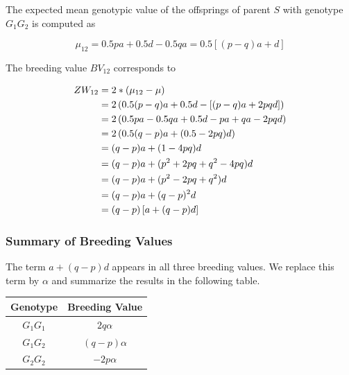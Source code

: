 \documentclass[
]{book}
\theoremstyle{definition}
\theoremstyle{definition}
\theoremstyle{definition}
\theoremstyle{remark}
\begin{document}
\vspace{5ex}

The expected mean genotypic value of the offsprings of parent \(S\) with genotype \(G_1G_2\) is computed as

\begin{equation}
\mu_{12} = 0.5pa + 0.5d - 0.5qa = 0.5\left[(p-q)a + d \right]
\label{eq:MeanOffGen12}
\end{equation}

The breeding value \(BV_{12}\) corresponds to

\begin{align}
ZW_{12} &=   2*(\mu_{12} - \mu) \notag \\
        &=   2\left(0.5(p-q)a + 0.5d - \left[(p - q)a + 2pqd \right] \right) \notag \\
        &=   2\left(0.5pa - 0.5qa + 0.5d - pa + qa - 2pqd \right) \notag \\
        &=   2\left(0.5(q-p)a + (0.5 - 2pq)d \right) \notag \\
        &=   (q-p)a + (1-4pq)d  \notag \\
        &=   (q-p)a + (p^2 + 2pq + q^2 -4pq)d  \notag \\
        &=   (q-p)a + (p^2 - 2pq + q^2)d  \notag \\
        &=   (q-p)a + (q - p)^2d   \notag \\
        &=   (q-p)\left[a + (q-p)d \right]
\label{eq:BVGen12}
\end{align}

\hypertarget{summary-of-breeding-values}{%
\subsubsection{Summary of Breeding Values}\label{summary-of-breeding-values}}

The term \(a + (q-p)d\) appears in all three breeding values. We replace this term by \(\alpha\) and summarize the results in the following table.

\vspace{5ex}

\begin{center} 
\begin{tabular}{|c|c|}
  \hline
  Genotype  &  Breeding Value\\
  \hline
  $G_1G_1$  &  $2q\alpha$    \\
  \hline
  $G_1G_2$  &  $(q-p)\alpha$ \\
  \hline
  $G_2G_2$  &  $-2p\alpha$   \\
  \hline
\end{tabular}
\end{center}
\end{document}
